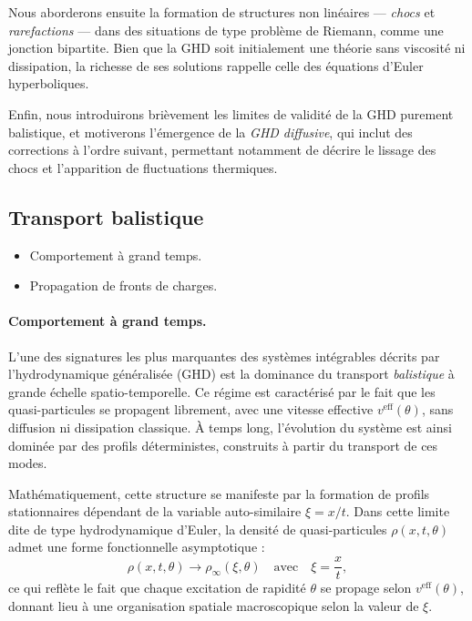 Nous aborderons ensuite la formation de structures non linéaires — \emph{chocs} et \emph{rarefactions} — dans des situations de type problème de Riemann, comme une jonction bipartite. Bien que la GHD soit initialement une théorie sans viscosité ni dissipation, la richesse de ses solutions rappelle celle des équations d’Euler hyperboliques.

Enfin, nous introduirons brièvement les limites de validité de la GHD purement balistique, et motiverons l’émergence de la \emph{GHD diffusive}, qui inclut des corrections à l’ordre suivant, permettant notamment de décrire le lissage des chocs et l’apparition de fluctuations thermiques.

\subsection{Transport balistique}
{\color{blue}
\begin{itemize}
    \item Comportement à grand temps.
    \item Propagation de fronts de charges.
\end{itemize}
}

\paragraph{Comportement à grand temps.}
L’une des signatures les plus marquantes des systèmes intégrables décrits par l’hydrodynamique généralisée (GHD) est la dominance du transport \emph{balistique} à grande échelle spatio-temporelle. Ce régime est caractérisé par le fait que les quasi-particules se propagent librement, avec une vitesse effective $v^{\mathrm{eff}}(\theta)$, sans diffusion ni dissipation classique. À temps long, l’évolution du système est ainsi dominée par des profils déterministes, construits à partir du transport de ces modes.

Mathématiquement, cette structure se manifeste par la formation de profils stationnaires dépendant de la variable auto-similaire $\xi = x/t$. Dans cette limite dite de type hydrodynamique d’Euler, la densité de quasi-particules $\rho(x,t,\theta)$ admet une forme fonctionnelle asymptotique :
\[
\rho(x,t,\theta) \longrightarrow \rho_\infty(\xi,\theta) \quad \text{avec} \quad \xi = \frac{x}{t},
\]
ce qui reflète le fait que chaque excitation de rapidité $\theta$ se propage selon $v^{\mathrm{eff}}(\theta)$, donnant lieu à une organisation spatiale macroscopique selon la valeur de $\xi$.

